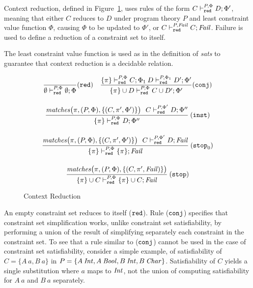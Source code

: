 Context reduction, defined in Figure~\ref{Context-reduction-fig}, uses
rules of the form $C \vdash_{\texttt{red}}^{P,\Phi} D;\Phi'$, meaning that
either $C$ reduces to $D$ under program theory $P$ and least
constraint value function $\Phi$, causing $\Phi$ to be updated to
$\Phi'$, or $C \vdash_{\texttt{red}}^{P,\text{\it Fail\/}} C;\text{\it Fail\/}$. Failure is used to
define a reduction of a constraint set to itself.

The least constraint value function is used as in the definition of
{\it sats\/} to guarantee that context reduction is a decidable
relation.

\begin{figure}

  \[ \begin{array}{c}
       \begin{array}{cc}
         \displaystyle\frac{}
                           {\emptyset \vdash_{\texttt{red}}^{P,\Phi} \emptyset;\Phi} (\texttt{red}) &
         \displaystyle\frac{\{ \pi \} \vdash_{\texttt{red}}^{P,\Phi} C;\Phi_1  \:
                            D \vdash_{\texttt{red}}^{P,\Phi_1} D';\Phi'}
      	                   {\{ \pi \} \cup D \vdash_{\texttt{red}}^{P,\Phi} C \cup D';\Phi'} (\texttt{conj})
      \end{array}\\[.8cm]

       \displaystyle\frac{\text{\it matches\/}\bigl(\pi,(P,\Phi),\{(C,\pi',\Phi')\}\bigr)
                           \:\:\: C \vdash_{\texttt{red}}^{P,\Phi'} D;\Phi''}
       	                 {\{ \pi \} \vdash_{\texttt{red}}^{P,\Phi} D;\Phi''}\: (\texttt{inst})\\[.8cm]
       \displaystyle\frac{\text{\it matches\/}\bigl(\pi,(P,\Phi),\{(C,\pi',\Phi')\}\bigr) \:\:\:
                            C \vdash_{\texttt{red}}^{P,\Phi'} D;\text{\it Fail\/}}
       	                 {\{ \pi \} \vdash_{\texttt{red}}^{P,\Phi} \{ \pi \}; \text{\it Fail\/}} \: (\texttt{stop}_0) \\[.8cm]
       \begin{array}{c}
       \displaystyle\frac{\text{\it matches\/}\bigl(\pi,(P,\Phi),\{(C,\pi',\text{\it Fail\/})\}\bigr)}
       	                 {\{ \pi \} \cup C \vdash_{\texttt{red}}^{P,\Phi} \{ \pi \}\cup C;\text{\it Fail\/}} \: (\texttt{stop})
       \end{array}
    \end{array}
  \]
\caption{Context Reduction}
\label{Context-reduction-fig}
\end{figure}

An empty constraint set reduces to itself ($\texttt{red}$).  Rule ($\texttt{conj}$)
specifies that constraint set simplification works, unlike constraint
set satisfiability, by performing a union of the result of
simplifying separately each constraint in the constraint set.
To see that a rule similar to ($\texttt{conj}$) cannot be used in the case of
constraint set satisfiability, consider a simple example, of
satisfiability of $C = \{A\:a, B\: a\}$ in $P = \{A\:{\it Int\/},A\:
{\it Bool\/},B\: {\it Int\/},B\: {\it Char\/}\}$. Satisfiability of $C$ yields a single
substitution where $a$ maps to ${\it Int\/}$, not the union of computing
satisfiability for $A\:a$ and $B\:a$ separately.

